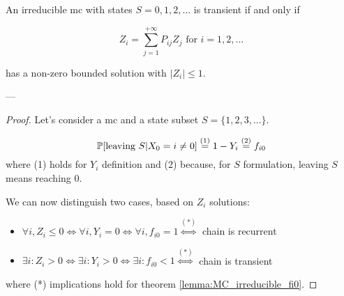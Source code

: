 	\begin{theorem}
		An irreducible \gls{mc} with states $S = 0, 1, 2, ...$ is transient if and only if

		$$ Z_i = \sum_{j=1}^{+\infty} P_{ij} Z_j \text{ for } i = 1, 2, ...$$

		has a non-zero bounded solution with $ |Z_i| \le 1$.
	\end{theorem}
	---
	\begin{proof}
		Let's consider a \gls{mc} and a state subset $S = \{1, 2, 3, ...\}$.

		$$ \mathbb{P}[\text{leaving } S| X_0 = i \neq 0] \stackrel{(1)}{=}
			1 - Y_i \stackrel{(2)}{=} f_{i0} $$
		where (1) holds for $Y_i$ definition and (2) because, for $S$ formulation, leaving $S$ means reaching 0.

		We can now distinguish two cases, based on $Z_i$ solutions:
		\begin{itemize}
			\item $ \forall i, Z_i \le 0 \Leftrightarrow \forall i, Y_i = 0 \Leftrightarrow \forall i, f_{i0} = 1 \stackrel{(*)}{\Leftrightarrow} $ chain is recurrent

			\item $ \exists i: Z_i > 0 \Leftrightarrow \exists i: Y_i > 0 \Leftrightarrow \exists i: f_{i0} < 1 \stackrel{(*)}{\Leftrightarrow} $ chain is transient
		\end{itemize}
		where (*) implications hold for theorem \ref{lemma:MC_irreducible_fi0}.
	\end{proof}

